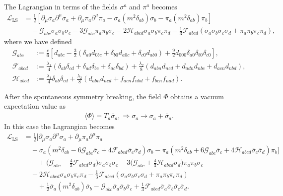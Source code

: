 \documentclass[a4paper,preprint,superscriptaddress,preprintnumbers,nofootinbib]{revtex4}
\newcommand{\al}[1]{\begin{align}#1\end{align}}
\newcommand{\nn}{\nonumber\\}
\newcommand{\p}{\partial}
\newcommand{\bra}{\langle}
\newcommand{\ket}{\rangle}
\newcommand{\Lag}{\mathcal L}
\begin{document}
\begin{appendix}
The Lagrangian in terms of the fields $\sigma^a$ and $\pi^a$ becomes
\al{
\Lag_\text{LS}
&=\frac{1}{2}\left[\p_\mu \sigma_a\p^\mu \sigma_a+\p_\mu \pi_a\p^\mu \pi_a-\sigma_a(m^2\delta_{ab})\sigma_b-\pi_a(m^2\delta_{ab})\pi_b\right]\nn
&\quad +{\mathcal G}_{abc}\sigma_a\sigma_b\sigma_c
 -3{\mathcal G}_{abc} \pi_a\pi_b\sigma_c
 -2{\mathcal H}_{abcd}\sigma_a\sigma_b\pi_c\pi_d
  -\frac{1}{3}{\mathcal F}_{abcd}(\sigma_a\sigma_b\sigma_c\sigma_d+\pi_a\pi_b\pi_c\pi_d),
}
where we have defined 
\al{
{\mathcal G}_{abc}&:=\frac{c}{6} 
\left[d_{abc}
-\frac{3}{2}(\delta_{a0}d_{0bc}+\delta_{b0}d_{a0c}+\delta_{c0}d_{ab0})
+\frac{9}{2}d_{000}\delta_{a0}\delta_{b0}\delta_{c0}
\right],
\label{Gabc}
\\
{\mathcal F}_{abcd}&:= \frac{\lambda_1}{4}(\delta_{ab}\delta_{cd}+\delta_{ad}\delta_{bc}+\delta_{ac}\delta_{bd})
+\frac{\lambda_2}{8}(d_{abn}d_{ncd}+d_{adn}d_{nbc}+d_{acn}d_{nbd}),
\label{Fabcd}
\\
{\mathcal H}_{abcd}&:=\frac{\lambda_1}{4}\delta_{ab}\delta_{cd}
+\frac{\lambda_2}{8}(d_{abn}d_{ncd}+f_{acn}f_{nbd}+f_{bcn}f_{nad}).
\label{Habcd}
}

After the spontaneous symmetry breaking, the field $\Phi$ obtains a vacuum expectation value as
\al{
\bra \Phi \ket = T_a\bar \sigma_a,
\Rightarrow
\sigma_a \to \sigma_a+\bar \sigma_a.
}
In this case the Lagrangian becomes
\al{
\Lag_\text{LS}&=
\frac{1}{2}\bigg[\p_\mu \sigma_a\p^\mu \sigma_a
+\p_\mu \pi_a\p^\mu \pi_a\nn
&\quad-\sigma_a(m^2\delta_{ab}
-6{\mathcal G}_{abc}\bar \sigma_c
+4{\mathcal F}_{abcd}\bar \sigma_c\bar \sigma_d
)\sigma_b
-\pi_a(m^2\delta_{ab}
+6{\mathcal G}_{abc}\bar \sigma_c
+4{\mathcal H}_{abcd}\bar \sigma_c\bar \sigma_d)\pi_b\bigg]\nn
&\qquad +\bigg({\mathcal G}_{abc}-\frac{4}{3}{\mathcal F}_{abcd}\bar \sigma_d\bigg) \sigma_a\sigma_b\sigma_c
-3 \bigg({\mathcal G}_{abc}+\frac{4}{3}{\mathcal H}_{abcd}\bar \sigma_d\bigg)\pi_a\pi_b\sigma_c\nn
&\quad -2{\mathcal H}_{abcd}\sigma_a\sigma_b\pi_c\pi_d-\frac{1}{3}{\mathcal F}_{abcd}(\sigma_a\sigma_b\sigma_c\sigma_d+\pi_a\pi_b\pi_c\pi_d)\nn
&\qquad + \frac{1}{2}\bar \sigma_a(m^2\delta_{ab})\bar \sigma_b
-{\mathcal G}_{abc}\bar \sigma_a\bar \sigma_b\bar \sigma_c
+\frac{1}{3}{\mathcal F}_{abcd}\bar \sigma_a\bar \sigma_b\bar \sigma_c\bar \sigma_d.
\label{lagrangianbroken}
}


\end{appendix}
\end{document}
